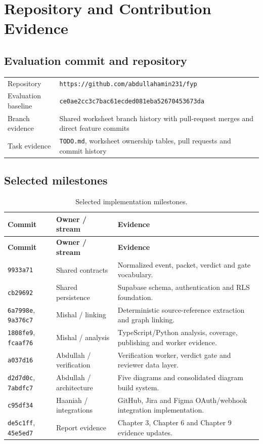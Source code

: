 \chapter{Repository and Contribution Evidence}

\section{Evaluation commit and repository}

\begin{tabular}{>{\raggedright\arraybackslash}p{}>{\raggedright\arraybackslash}p{}}
\toprule
Repository & \texttt{https://github.com/abdullahamin231/fyp}\\
Evaluation baseline & \texttt{ce0ae2cc3c7bac61ecded081eba52670453673da}\\
Branch evidence & Shared worksheet branch history with pull-request merges and direct feature commits\\
Task evidence & \texttt{TODO.md}, worksheet ownership tables, pull requests and commit history\\
\bottomrule
\end{tabular}

\section{Selected milestones}

\begin{longtable}{>{\raggedright\arraybackslash}p{}>{\raggedright\arraybackslash}p{}>{\raggedright\arraybackslash}p{}}
\caption{Selected implementation milestones.}\label{tab:appendix-milestones}\\
\toprule
\textbf{Commit} & \textbf{Owner / stream} & \textbf{Evidence}\\
\midrule
\endfirsthead
\toprule
\textbf{Commit} & \textbf{Owner / stream} & \textbf{Evidence}\\
\midrule
\endhead
\texttt{9933a71} & Shared contracts & Normalized event, packet, verdict and gate vocabulary.\\
\texttt{cb29692} & Shared persistence & Supabase schema, authentication and RLS foundation.\\
\texttt{6a7998e}, \texttt{9a376c7} & Mishal / linking & Deterministic source-reference extraction and graph linking.\\
\texttt{1808fe9}, \texttt{fcaaf76} & Mishal / analysis & TypeScript/Python analysis, coverage, publishing and worker evidence.\\
\texttt{a037d16} & Abdullah / verification & Verification worker, verdict gate and reviewer data layer.\\
\texttt{d2d7d0c}, \texttt{7abdfc7} & Abdullah / architecture & Five diagrams and consolidated diagram build system.\\
\texttt{c95df34} & Haaniah / integrations & GitHub, Jira and Figma OAuth/webhook integration implementation.\\
\texttt{de5c1ff}, \texttt{45e5ed7} & Report evidence & Chapter 3, Chapter 6 and Chapter 9 evidence updates.\\
\bottomrule
\end{longtable}

